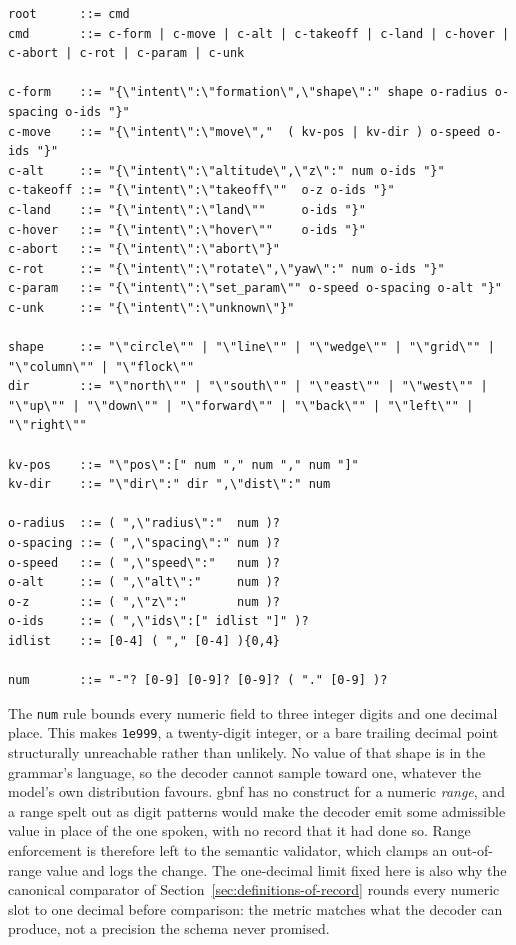 \begin{lstlisting}[basicstyle=\ttfamily\footnotesize, breaklines=true]
root      ::= cmd
cmd       ::= c-form | c-move | c-alt | c-takeoff | c-land | c-hover | c-abort | c-rot | c-param | c-unk

c-form    ::= "{\"intent\":\"formation\",\"shape\":" shape o-radius o-spacing o-ids "}"
c-move    ::= "{\"intent\":\"move\","  ( kv-pos | kv-dir ) o-speed o-ids "}"
c-alt     ::= "{\"intent\":\"altitude\",\"z\":" num o-ids "}"
c-takeoff ::= "{\"intent\":\"takeoff\""  o-z o-ids "}"
c-land    ::= "{\"intent\":\"land\""     o-ids "}"
c-hover   ::= "{\"intent\":\"hover\""    o-ids "}"
c-abort   ::= "{\"intent\":\"abort\"}"
c-rot     ::= "{\"intent\":\"rotate\",\"yaw\":" num o-ids "}"
c-param   ::= "{\"intent\":\"set_param\"" o-speed o-spacing o-alt "}"
c-unk     ::= "{\"intent\":\"unknown\"}"

shape     ::= "\"circle\"" | "\"line\"" | "\"wedge\"" | "\"grid\"" | "\"column\"" | "\"flock\""
dir       ::= "\"north\"" | "\"south\"" | "\"east\"" | "\"west\"" | "\"up\"" | "\"down\"" | "\"forward\"" | "\"back\"" | "\"left\"" | "\"right\""

kv-pos    ::= "\"pos\":[" num "," num "," num "]"
kv-dir    ::= "\"dir\":" dir ",\"dist\":" num

o-radius  ::= ( ",\"radius\":"  num )?
o-spacing ::= ( ",\"spacing\":" num )?
o-speed   ::= ( ",\"speed\":"   num )?
o-alt     ::= ( ",\"alt\":"     num )?
o-z       ::= ( ",\"z\":"       num )?
o-ids     ::= ( ",\"ids\":[" idlist "]" )?
idlist    ::= [0-4] ( "," [0-4] ){0,4}

num       ::= "-"? [0-9] [0-9]? [0-9]? ( "." [0-9] )?
\end{lstlisting}

The \texttt{num} rule bounds every numeric field to three integer digits and one decimal place.
This makes \texttt{1e999}, a twenty-digit integer, or a bare trailing decimal point structurally
unreachable rather than unlikely. No value of that shape is in the grammar's language, so the
decoder cannot sample toward one, whatever the model's own distribution favours. \gls{gbnf} has no
construct for a numeric \emph{range}, and a range spelt out as digit patterns would make the
decoder emit some admissible value in place of the one spoken, with no record that it had done so.
Range enforcement is therefore left to the semantic validator, which clamps an out-of-range value
and logs the change.
The one-decimal limit fixed here is also why the canonical comparator of
Section~\ref{sec:definitions-of-record} rounds every numeric slot to one decimal before comparison:
the metric matches what the decoder can produce, not a precision the schema never promised.

